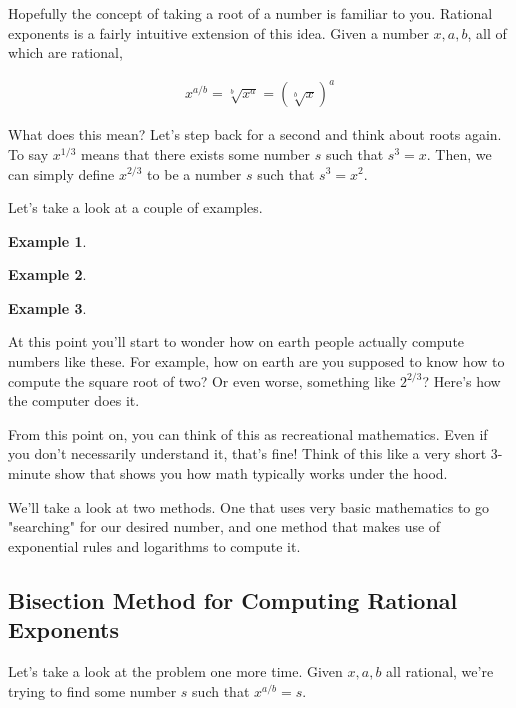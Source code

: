 \documentclass{scrbook}
\theoremstyle{definition}
\newtheorem{example}{Example}
\begin{document}
Hopefully the concept of taking a root of a number is familiar to you. Rational exponents is a fairly intuitive extension of this idea. Given a number $x, a, b$, all of which are rational, 

\begin{align*}
  x^{a/b} = \sqrt[b]{x^a} = (\sqrt[b]{x})^a
\end{align*}

What does this mean? Let's step back for a second and think about roots again. To say $x^{1/3}$ means that there exists some number $s$ such that $s^3 = x$. Then, we can simply define $x^{2/3}$ to be a number $s$ such that $s^3 = x^2$. 

Let's take a look at a couple of examples.

\begin{example}
  
\end{example}

\begin{example}
  
\end{example}

\begin{example}
  
\end{example}

At this point you'll start to wonder how on earth people actually compute numbers like these. For example, how on earth are you supposed to know how to compute the square root of two? Or even worse, something like $2^{2/3}$? Here's how the computer does it.

From this point on, you can think of this as recreational mathematics. Even if you don't necessarily understand it, that's fine! Think of this like a very short 3-minute show that shows you how math typically works under the hood. 

We'll take a look at two methods. One that uses very basic mathematics to go "searching" for our desired number, and one method that makes use of exponential rules and logarithms to compute it. 

\subsection{Bisection Method for Computing Rational Exponents}

Let's take a look at the problem one more time. Given $x, a, b$ all rational, we're trying to find some number $s$ such that $x^{a/b} = s$.
\end{document}
